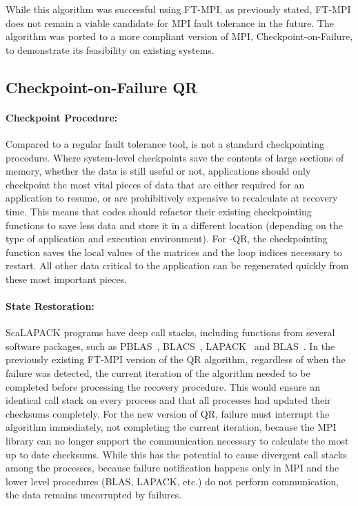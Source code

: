 While this algorithm was successful using FT-MPI, as previously stated, FT-MPI 
does not remain a viable candidate for MPI fault tolerance in the future. The 
algorithm was ported to a more compliant version of MPI, Checkpoint-on-Failure, 
to demonstrate its feasibility on existing systems.

\subsection{Checkpoint-on-Failure QR}

\paragraph*{Checkpoint Procedure:} 
Compared to a regular fault tolerance tool, \cof is not a standard checkpointing 
procedure. Where system-level checkpoints save the contents of large sections of 
memory, whether the data is still useful or not, \cof applications should only 
checkpoint the most vital pieces of data that are either required for an 
application to resume, or are prohibitively expensive to recalculate at recovery 
time. This means that codes should refactor their existing checkpointing 
functions to save less data and store it in a different location (depending on 
the type of application and execution environment). For \cof-QR, the 
checkpointing function saves the local values of the matrices and the loop 
indices necessary to restart. All other data critical to the application can be 
regenerated quickly from these most important pieces.

\paragraph*{State Restoration:} 
ScaLAPACK programs have deep call stacks,
including functions from several software packages, such as
PBLAS~\cite{Choi:1995:PSP:898829}, BLACS~\cite{Dongarra:1991vn, Dongarra:1995uu}, LAPACK~\cite{Anderson:1990th} and BLAS~\cite{Choi:1996wy}.
In the previously existing FT-MPI version of the QR algorithm, regardless of
when the failure was detected, the current iteration of the algorithm needed to
be completed before processing the recovery procedure. This would ensure an
identical call stack on every process and that all processes had updated their
checksums completely. For the new \cof version of QR, failure must interrupt the
algorithm immediately, not completing the current iteration, because the MPI
library can no longer support the communication necessary to calculate the most
up to date checksums. While this has the potential to cause divergent call
stacks among the processes, because failure notification happens only in MPI and
the lower level procedures (BLAS, LAPACK, etc.) do not perform communication,
the data remains uncorrupted by failures.

